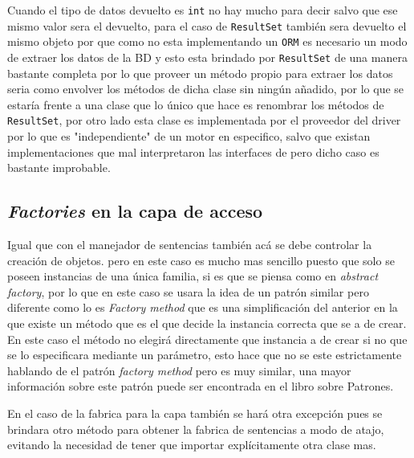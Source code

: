 Cuando el tipo de datos devuelto es \verb=int= no hay mucho para decir salvo que ese mismo valor sera el devuelto, para el caso de \verb=ResultSet= también sera devuelto el mismo objeto por que como \jj no esta implementando un \verb=ORM= es necesario un modo de extraer los datos de la BD y esto esta brindado por \verb=ResultSet= de una manera bastante completa por lo que proveer un método propio para extraer los datos seria como envolver los métodos de dicha clase sin ningún añadido, por lo que se estaría frente a una clase que lo único que hace es renombrar los métodos de \verb=ResultSet=, por otro lado esta clase es implementada por el proveedor del driver por lo que es "independiente" de un motor en especifico, salvo que existan implementaciones que mal interpretaron las interfaces de \jd pero dicho caso es bastante improbable.
%
\subsection{\textit{Factories} en la capa de acceso}
Igual que con el manejador de sentencias también acá se debe controlar la creación de objetos. pero en este caso es mucho mas sencillo puesto que solo  se poseen instancias de una única familia, si es que se piensa como en \textit{abstract factory}, por lo que en este caso se usara la idea de un patrón similar pero diferente como lo es \textit{Factory method} que es una simplificación del anterior en la que existe un método que es el que decide la instancia correcta que se a de crear. En este caso el método no elegirá directamente que instancia a de crear si no que se lo especificara mediante un parámetro, esto hace que no se este estrictamente hablando de el patrón \textit{factory method} pero es muy similar, una mayor información sobre este patrón puede ser encontrada en el libro sobre Patrones\citep{Metsker:2002:DPJ}. 

En el caso de la fabrica para la capa también se hará otra excepción pues se brindara otro método para obtener la fabrica de sentencias a modo de atajo, evitando la necesidad de tener que importar explícitamente otra clase mas.